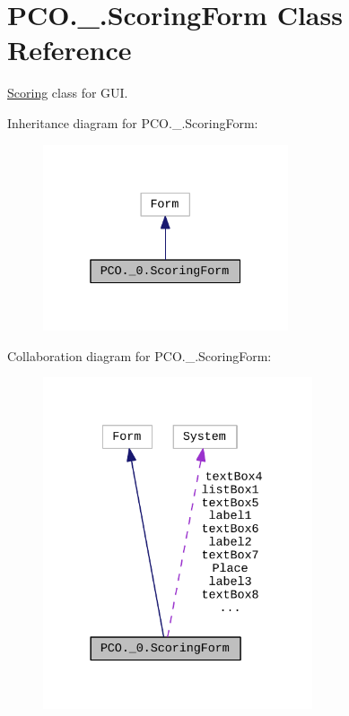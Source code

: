 \hypertarget{classPCO_1_1__0_1_1ScoringForm}{}\section{P\+C\+O.\+\_.\+Scoring\+Form Class Reference}
\label{classPCO_1_1__0_1_1ScoringForm}


\hyperlink{classScoring}{Scoring} class for G\+UI.  




Inheritance diagram for P\+C\+O.\+\_.\+Scoring\+Form\+:\nopagebreak
\begin{figure}[H]
\begin{center}
\leavevmode
\includegraphics[width=205pt]{classPCO_1_1__0_1_1ScoringForm__inherit__graph}
\end{center}
\end{figure}


Collaboration diagram for P\+C\+O.\+\_.\+Scoring\+Form\+:\nopagebreak
\begin{figure}[H]
\begin{center}
\leavevmode
\includegraphics[width=225pt]{classPCO_1_1__0_1_1ScoringForm__coll__graph}
\end{center}
\end{figure}
